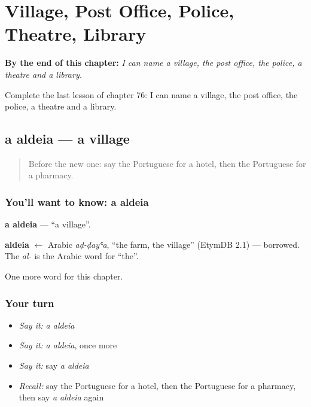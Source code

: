 
\chapter{Village, Post Office, Police, Theatre, Library}
\label{ch:pt-village-post-office-police-theatre-library}

\begin{chapteropening}
\textbf{By the end of this chapter:} \emph{I can name a village, the post office, the police, a theatre and a library.}

Complete the last lesson of chapter 76: I can name a village, the post office, the police, a theatre and a library.
\end{chapteropening}

\section[a aldeia]{a aldeia — a village}

\label{lesson:PT-C76-aldeia}



\begin{quote}
Before the new one: say the Portuguese for a hotel, then the Portuguese for a pharmacy.
\end{quote}

\subsection*{You'll want to know: a aldeia}
\textbf{a aldeia} — \textquotedblleft{}a village\textquotedblright{}.

\begin{cousinweb}
\textbf{aldeia} $\leftarrow$ Arabic \emph{aḍ-ḍayʿa}, \textquotedblleft{}the farm, the village\textquotedblright{} (EtymDB 2.1) — borrowed. The \emph{al-} is the Arabic word for \textquotedblleft{}the\textquotedblright{}.
\end{cousinweb}

\begin{grammarlens}[title={What you've built}]
One more word for this chapter.
\end{grammarlens}

\subsection*{Your turn}
\begin{itemize}
\raggedright
  \item \emph{Say it:} \emph{a aldeia}
  \item \emph{Say it:} \emph{a aldeia}, once more
  \item \emph{Say it:} say \emph{a aldeia}
  \item \emph{Recall:} say the Portuguese for a hotel, then the Portuguese for a pharmacy, then say \emph{a aldeia} again
\end{itemize}

